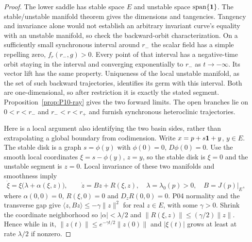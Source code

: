 \begin{proof}
The lower saddle has stable space $E$ and unstable space
$\operatorname{span}\{\mathbf{1}\}$. The stable/unstable manifold theorem
gives the dimensions and tangencies. Tangency and invariance alone
would not establish an arbitrary invariant curve's equality with
an unstable manifold, so check the backward-orbit characterization.
On a sufficiently small synchronous interval around $r_-$ the scalar
field has a simple repelling zero, $f_r(r_-,g)>0$. Every point of
that interval has a negative-time orbit staying in the interval and
converging exponentially to $r_-$ as $t\to-\infty$. Its vector lift
has the same property. Uniqueness of the local unstable manifold,
as the set of such backward trajectories, identifies its germ with
this interval. Both are one-dimensional, so after restriction it is
exactly the stated segment. Proposition~\ref{prop:P10-ray} gives
the two forward limits. The open branches lie on $0<r<r_-$ and
$r_-<r<r_+$ and furnish synchronous heteroclinic trajectories.

Here is a local argument also identifying the two basin sides, rather
than extrapolating a global boundary from codimension. Write
$x=p+s\mathbf{1}+y$, $y\in E$. The stable disk is a graph $s=\phi(y)$
with $\phi(0)=0$, $D\phi(0)=0$. Use the smooth local coordinates
$\xi=s-\phi(y)$, $z=y$, so the stable disk is $\xi=0$ and the
unstable segment is $z=0$. Local invariance of these two manifolds
and smoothness imply
\begin{equation}
 \dot\xi=\xi\bigl(\lambda+\alpha(\xi,z)\bigr),\qquad
 \dot z=Bz+R(\xi,z),
 \quad \lambda=\lambda_0(p)>0,\quad B=J(p)|_E,
 \label{eq:P10-saddle-chart}
\end{equation}
where $\alpha(0,0)=0$, $R(\xi,0)=0$ and $D_zR(0,0)=0$.
P04 normality and the transverse gap give
$\langle z,Bz\rangle\le-\gamma\|z\|^2$ for real $z\in E$,
with some $\gamma>0$. Shrink the coordinate neighborhood so
$|\alpha|<\lambda/2$ and $\|R(\xi,z)\|\le(\gamma/2)\|z\|$.
Hence while in it, $\|z(t)\|\le e^{-\gamma t/2}\|z(0)\|$
and $|\xi(t)|$ grows at least at rate $\lambda/2$ if nonzero.


\end{proof}
